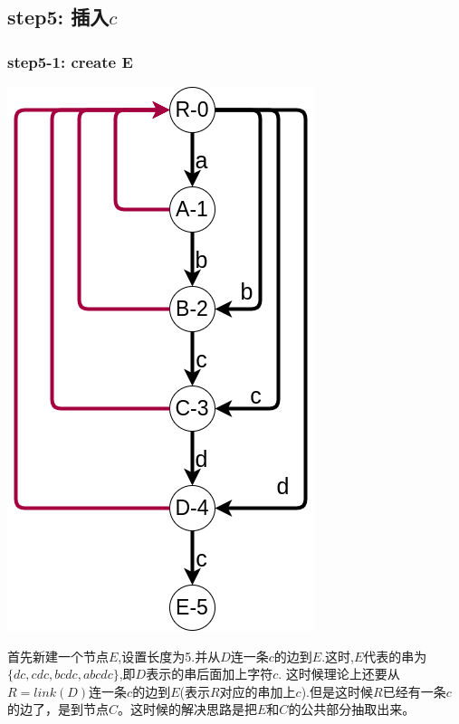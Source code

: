 \documentclass{article}
\begin{document}
\subsection{step5: 插入$c$}
\subsubsection{step5-1: create E}
\includegraphics[scale=0.5]{step51.png} \par
首先新建一个节点$E$,设置长度为5.并从$D$连一条$c$的边到$E$.这时,$E$代表的串为$\{dc,cdc,bcdc,abcdc\}$,即$D$表示的串后面加上字符$c$. 这时候理论上还要从$R=link(D)$连一条$c$的边到$E$(表示$R$对应的串加上$c$).但是这时候$R$已经有一条$c$的边了，是到节点$C$。这时候的解决思路是把$E$和$C$的公共部分抽取出来。 \par
\end{document}
